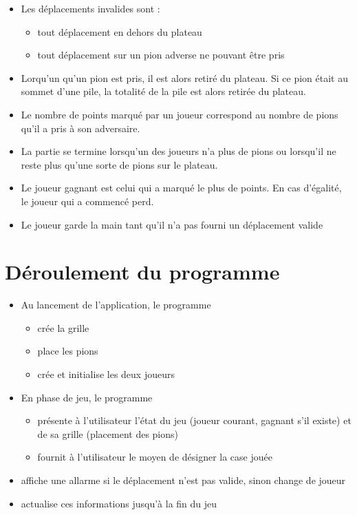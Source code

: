 \documentclass[12pt]{article}
\begin{document}
\begin{itemize}
 \item Les déplacements invalides sont :
\begin{itemize}
 \item[\textbullet] tout déplacement en dehors du plateau 
 \item[\textbullet] tout déplacement sur un pion adverse ne pouvant être pris
\end{itemize}
\item Lorqu'un qu'un pion est pris, il est alors retiré du plateau. Si ce pion était au sommet d'une pile, la totalité de la pile est alors retirée du plateau. 
\item Le nombre de points marqué par un joueur correspond au nombre de pions qu'il a pris à son adversaire.
\item La partie se termine lorsqu'un des joueurs n'a plus de pions ou lorsqu'il ne reste plus qu'une sorte de pions sur le plateau.
\item Le joueur gagnant est celui qui a marqué le plus de points. En cas d'égalité, le joueur qui a commencé perd.
\item Le joueur garde la main tant qu'il n'a pas fourni un déplacement valide
\end{itemize}

\section{Déroulement du programme}
 \begin{itemize}
 \item Au lancement de l'application, le programme
 \begin{itemize}
  \item[\textbullet] crée la grille
  \item[\textbullet] place les pions
  \item[\textbullet] crée et initialise les deux joueurs
 \end{itemize}
 \item En phase de jeu, le programme
 \begin{itemize}
  \item[\textbullet] présente à l'utilisateur l'état du jeu (joueur courant, gagnant s'il existe) et de sa grille (placement des pions)
  \item[\textbullet] fournit à l'utilisateur le moyen de désigner la case jouée
  \end{itemize}
 
  \item affiche une allarme si le déplacement n'est pas valide, sinon change de joueur
  \item actualise ces informations jusqu'à la fin du jeu
 \end{itemize}
\end{document}
